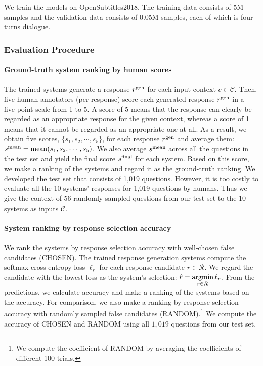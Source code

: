 \documentclass[11pt,a4paper]{article}
\newcommand{\argmin}{\mathop{\rm argmin}\limits}
\begin{document}
We train the models on OpenSubtitles2018.
The training data consists of 5M samples and the validation data consists of 0.05M samples, each of which is four-turns dialogue.


\subsubsection{Evaluation Procedure}

\paragraph{Ground-truth system ranking by human scores}
The trained systems generate a response $r^{\rm gen}$ for each input context $c \in \mathcal{C}$.
Then, five human annotators (per response) score each generated response $r^{\rm gen}$ in a five-point scale from 1 to 5.
A score of 5 means that the response can clearly be regarded as an appropriate response for the given context, whereas a score of 1 means that it cannot be regarded as an appropriate one at all.
As a result, we obtain five scores, $\{s_1, s_2, \cdots, s_5\}$, for each response $r^{\rm gen}$ and average them: $s^{\rm mean} = {\rm mean}(s_1, s_2, \cdots, s_5)$.
We also average $s^{\rm mean}$ across all the questions in the test set and yield the final score $s^{\rm final}$ for each system.
Based on this score, we make a ranking of the systems and regard it as the ground-truth ranking.
We developed the test set that consists of 1,019 questions.
However, it is too costly to evaluate all the 10 systems’ responses for 1,019 questions by humans.
Thus we give the context of $56$ randomly sampled questions from our test set to the 10 systems as inputs $\mathcal{C}$.


\paragraph{System ranking by response selection accuracy}
We rank the systems by response selection accuracy with well-chosen false candidates (CHOSEN).
The trained response generation systems compute the softmax cross-entropy loss $\ell_r$ for each response candidate $r \in \mathcal{R}$.
We regard the candidate with the lowest loss as the system's selection: $\hat{r} = \argmin_{r \in \mathcal{R}} \ell_r$.
From the predictions, we calculate accuracy and make a ranking of the systems based on the accuracy.
For comparison, we also make a ranking by response selection accuracy with randomly sampled false candidates (RANDOM).\footnote{We compute the coefficient of RANDOM by averaging the coefficients of different 100 trials.}
We compute the accuracy of CHOSEN and RANDOM using all $1,019$ questions from our test set.
\end{document}
